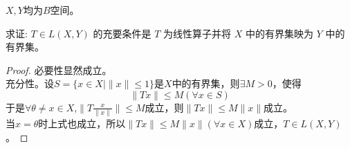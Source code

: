 \documentclass[lang=cn,newtx,10pt,scheme=chinese,thmcnt=chapter]{elegantbook}
\begin{document}
${{{X}}},{Y}$均为$B$空间。
\begin{problem}
求证: $T \in {L}( {X} , {Y} )$ 的充要条件是 $T$ 为线性算子并将 ${X}$ 中的有界集映为 ${Y}$ 中的有界集。

\end{problem}
\begin{proof}
必要性显然成立。\\
充分性。设$S=\{x\in {X}|\|x\|\leqslant1\}$是${X}$中的有界集，则$\exists M>0$，使得
\[
\|Tx\|\leqslant M(\forall x\in S)
\]
于是$\forall \theta\neq x\in {X}$,$\|T\frac{x}{\|x\|}\|\leqslant M$成立，则$\|T{x}\|\leqslant M{\|x\|}$成立。\\
当$x=\theta$时上式也成立，所以$\|T{x}\|\leqslant M{\|x\|}(\forall x\in{X})$成立，$T \in {L}( {X} , {Y} )$。
\end{proof}
\end{document}
